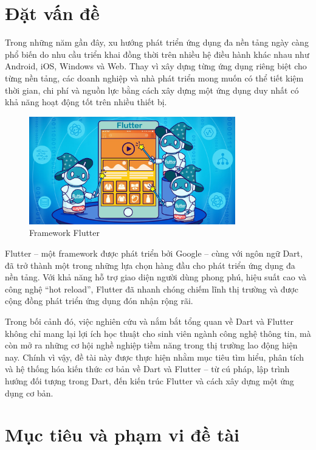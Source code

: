 \section{Đặt vấn đề}
\label{section:1.1}

Trong những năm gần đây, xu hướng phát triển ứng dụng đa nền tảng ngày càng phổ biến do nhu cầu triển khai đồng thời trên nhiều hệ điều hành khác nhau như Android, iOS, Windows và Web. Thay vì xây dựng từng ứng dụng riêng biệt cho từng nền tảng, các doanh nghiệp và nhà phát triển mong muốn có thể tiết kiệm thời gian, chi phí và nguồn lực bằng cách xây dựng một ứng dụng duy nhất có khả năng hoạt động tốt trên nhiều thiết bị. 

\begin{figure}[H]
    \centering
    \includegraphics[width=0.8\textwidth]{Hinhve/Chuong1/flutter_image.jpeg}
    \caption{Framework Flutter}
    \label{fig:flutterimageintro}
\end{figure}

Flutter – một framework được phát triển bởi Google – cùng với ngôn ngữ Dart, đã trở thành một trong những lựa chọn hàng đầu cho phát triển ứng dụng đa nền tảng. Với khả năng hỗ trợ giao diện người dùng phong phú, hiệu suất cao và công nghệ “hot reload”, Flutter đã nhanh chóng chiếm lĩnh thị trường và được cộng đồng phát triển ứng dụng đón nhận rộng rãi.

Trong bối cảnh đó, việc nghiên cứu và nắm bắt tổng quan về Dart và Flutter không chỉ mang lại lợi ích học thuật cho sinh viên ngành công nghệ thông tin, mà còn mở ra những cơ hội nghề nghiệp tiềm năng trong thị trường lao động hiện nay. Chính vì vậy, đề tài này được thực hiện nhằm mục tiêu tìm hiểu, phân tích và hệ thống hóa kiến thức cơ bản về Dart và Flutter – từ cú pháp, lập trình hướng đối tượng trong Dart, đến kiến trúc Flutter và cách xây dựng một ứng dụng cơ bản.

\section{Mục tiêu và phạm vi đề tài}
\label{section:1.2}

